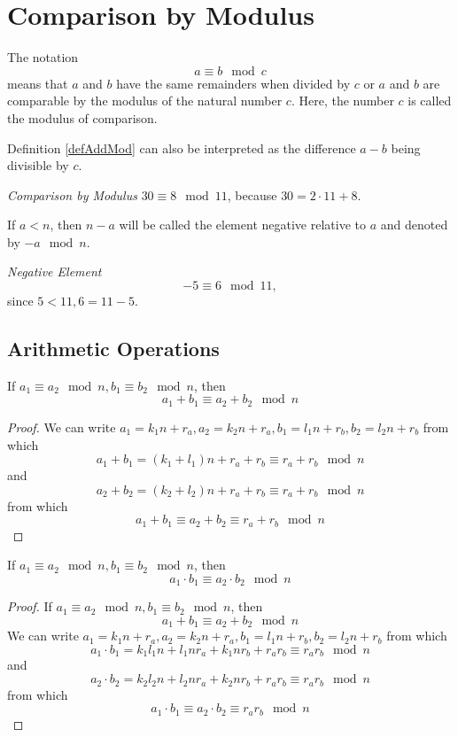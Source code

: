 \section{Comparison by Modulus}
\begin{definition}
The notation
\begin{equation}
a \equiv b \mod{c}
\label{defAddMod}
\end{equation}
means that $a$ and $b$ have the same remainders when divided by $c$ or $a$ and $b$ are comparable by the modulus of the natural number $c$. Here, the number $c$ is called the modulus of comparison.
\end{definition}

Definition \ref{defAddMod} can also be interpreted as the difference $a - b$ being divisible by $c$.

\begin{example}
\emph{Comparison by Modulus}
$30 \equiv 8 \mod{11}$, because $30 = 2 \cdot 11 + 8$.
\end{example}

\begin{definition}
If $a < n$, then $n - a$ will be called the element negative relative to $a$ and denoted by $-a \mod n$.
\end{definition}

\begin{example}
\emph{Negative Element}
\[
-5 \equiv 6 \mod 11,
\]
since $5 < 11, 6 = 11 - 5$.
\end{example}

\subsection{Arithmetic Operations}

\begin{lemma}
If $a_1 \equiv a_2 \mod n, b_1 \equiv b_2 \mod n$, then 
\[
a_1 + b_1 \equiv a_2 + b_2 \mod n
\]
\begin{proof}
We can write $a_1 = k_1 n + r_a, a_2 = k_2 n + r_a, b_1 = l_1 n + r_b, b_2 = l_2 n + r_b$ from which
\[
a_1 + b_1 = (k_1 + l_1) n + r_a + r_b \equiv r_a + r_b \mod n
\] 
and
\[
a_2 + b_2 = (k_2 + l_2) n + r_a + r_b \equiv r_a + r_b \mod n
\] 
from which
\[
a_1 + b_1 \equiv a_2 + b_2 \equiv r_a + r_b \mod n
\]
\end{proof}
\end{lemma}

\begin{lemma}
If $a_1 \equiv a_2 \mod n, b_1 \equiv b_2 \mod n$, then 
\[
a_1 \cdot b_1 \equiv a_2 \cdot b_2 \mod n
\]
\begin{proof}
If $a_1 \equiv a_2 \mod n, b_1 \equiv b_2 \mod n$, then 
\[
a_1 + b_1 \equiv a_2 + b_2 \mod n
\]
We can write $a_1 = k_1 n + r_a, a_2 = k_2 n + r_a, b_1 = l_1 n + r_b, b_2 = l_2 n + r_b$ from which
\[
a_1 \cdot b_1 = k_1 l_1 n + l_1 n r_a + k_1 n r_b + r_a r_b \equiv r_a r_b \mod n
\] 
and
\[
a_2 \cdot b_2 = k_2 l_2 n + l_2 n r_a + k_2 n r_b + r_a r_b \equiv r_a r_b \mod n
\] 
from which
\[
a_1 \cdot b_1 \equiv a_2 \cdot  b_2 \equiv r_a r_b \mod n
\]
\end{proof}
\end{lemma}

